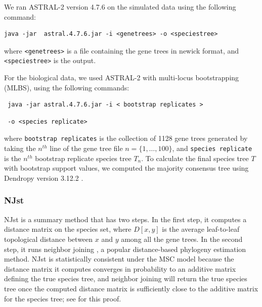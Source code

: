 
We ran ASTRAL-2 version 4.7.6 on the simulated data using the
following  command:
\begin{verbatim}
java -jar  astral.4.7.6.jar -i <genetrees> -o <speciestree>
\end{verbatim} 
\noindent
where {\tt <genetrees>}  is a file containing 
the gene trees in newick format, and 
{\tt <speciestree>} is the output.




For  the biological data, we used ASTRAL-2 with 
multi-locus bootstrapping (MLBS), using the following commands:
\begin{verbatim}
 java -jar astral.4.7.6.jar -i < bootstrap replicates >  \end{verbatim}
 \begin{verbatim} -o <species replicate> \end{verbatim}
where 
{\tt bootstrap replicates}
is the collection of 1128 gene trees generated by taking the $n^{th}$ line of the gene tree file $n = \{1, \ldots , 100\}$, and
{\tt species replicate}
is the $n^{th}$ bootstrap replicate species tree $T_{n}$.  To calculate the final species tree $T$ with bootstrap support values, we computed the majority consensus tree using Dendropy version 3.12.2  \cite{dendropy}.  

\subsubsection{NJst}
NJst is a summary method that 
has two steps. In the first step, it computes a distance matrix on
the species set, where $D[x,y]$ is the average
leaf-to-leaf topological distance between $x$ and $y$ among all the
gene trees. In the second step, it runs neighbor joining \cite{nj}, a popular
distance-based phylogeny estimation method. 
NJst is statistically consistent under the 
MSC model
because the distance matrix it computes converges in
probability to an additive matrix defining the true
species tree, and neighbor joining will return
the true species tree once the computed distance matrix  is
sufficiently close to the additive matrix for the species tree; see
\cite{NJst} for this proof.

